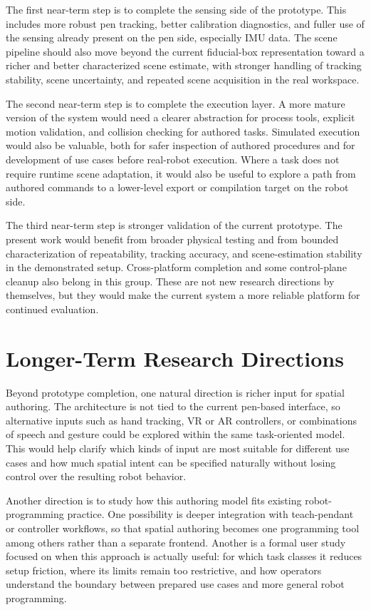The first near-term step is to complete the sensing side of the prototype. This includes more robust pen tracking, better calibration diagnostics, and fuller use of the sensing already present on the pen side, especially IMU data. The scene pipeline should also move beyond the current fiducial-box representation toward a richer and better characterized scene estimate, with stronger handling of tracking stability, scene uncertainty, and repeated scene acquisition in the real workspace.

The second near-term step is to complete the execution layer. A more mature version of the system would need a clearer abstraction for process tools, explicit motion validation, and collision checking for authored tasks. Simulated execution would also be valuable, both for safer inspection of authored procedures and for development of use cases before real-robot execution. Where a task does not require runtime scene adaptation, it would also be useful to explore a path from authored commands to a lower-level export or compilation target on the robot side.

The third near-term step is stronger validation of the current prototype. The present work would benefit from broader physical testing and from bounded characterization of repeatability, tracking accuracy, and scene-estimation stability in the demonstrated setup. Cross-platform completion and some control-plane cleanup also belong in this group. These are not new research directions by themselves, but they would make the current system a more reliable platform for continued evaluation.

\section{Longer-Term Research Directions}

Beyond prototype completion, one natural direction is richer input for spatial authoring. The architecture is not tied to the current pen-based interface, so alternative inputs such as hand tracking, VR or AR controllers, or combinations of speech and gesture could be explored within the same task-oriented model. This would help clarify which kinds of input are most suitable for different use cases and how much spatial intent can be specified naturally without losing control over the resulting robot behavior.

Another direction is to study how this authoring model fits existing robot-programming practice. One possibility is deeper integration with teach-pendant or controller workflows, so that spatial authoring becomes one programming tool among others rather than a separate frontend. Another is a formal user study focused on when this approach is actually useful: for which task classes it reduces setup friction, where its limits remain too restrictive, and how operators understand the boundary between prepared use cases and more general robot programming.

